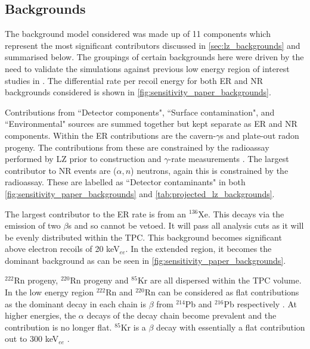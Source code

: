 \subsection{Backgrounds}
\par
The background model considered was made up of 11 components which represent the most significant contributors discussed in \autoref{sec:lz_backgrounds} and summarised below.
The groupings of certain backgrounds here were driven by the need to validate the simulations against previous low energy region of interest studies in \cite{LZ_projected_sensitivity_paper_ref,LZ_Ibles_LZStats_Thesis_ref}.
The differential rate per recoil energy for both ER and NR backgrounds considered is shown in \autoref{fig:sensitivity_paper_backgrounds}.

\par
Contributions from ``Detector components", ``Surface contamination", and ``Environmental" sources are summed together but kept separate as ER and NR components.
Within the ER contributions are the cavern-$\gamma$s and plate-out radon progeny.
The contributions from these are constrained by the radioassay performed by LZ prior to construction \cite{LZ_assay_ref} and $\gamma$-rate measurements \cite{LZ_Gamma_Ray_Background_ref}.
The largest contributor to NR events are ($\alpha,n$) neutrons, again this is constrained by the radioassay.
These are labelled as ``Detector contaminants" in both \autoref{fig:sensitivity_paper_backgrounds} and \autoref{tab:projected_lz_backgrounds}.
\par
The largest contributor to the ER rate is from an $^{136}$Xe.
This decays via the emission of two $\beta$s \cite{xenon136_ref} and so cannot be vetoed.
It will pass all analysis cuts as it will be evenly distributed within the TPC.
This background becomes significant above electron recoils of 20 keV$_{ee}$.
In the extended region, it becomes the dominant background as can be seen in \autoref{fig:sensitivity_paper_backgrounds}.
\par
${}^{222}$Rn progeny, ${}^{220}$Rn progeny and ${}^{85}$Kr are all dispersed within the TPC volume.
In the low energy region ${}^{222}$Rn and ${}^{220}$Rn can be considered as flat contributions as the dominant decay in each chain is $\beta$ from $^{214}$Pb and $^{216}$Pb respectively \cite{LZ_projected_sensitivity_paper_ref}.
At higher energies, the $\alpha$ decays of the decay chain become prevalent and the contribution is no longer flat.
${}^{85}$Kr is a $\beta$ decay with essentially a flat contribution out to 300 keV$_{ee}$ \cite{kr85_rate_ref}.
